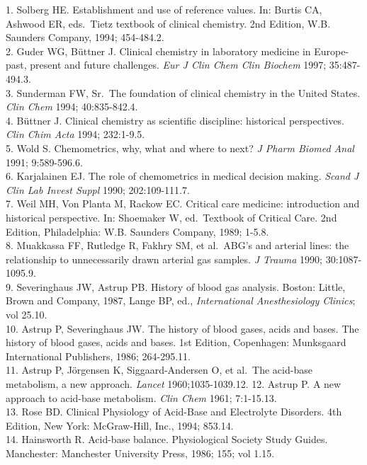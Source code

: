 \documentclass[
  12pt,
  a4paperpaper,
]{report}
\begin{document}
1. Solberg HE. Establishment and use of reference values. In: Burtis CA,
Ashwood ER, eds.~Tietz textbook of clinical chemistry. 2nd Edition, W.B.
Saunders Company, 1994; 454-484.2.\\
2. Guder WG, Büttner J. Clinical chemistry in laboratory medicine in
Europe-past, present and future challenges. \emph{Eur J Clin Chem Clin
Biochem} 1997; 35:487-494.3.\\
3. Sunderman FW, Sr.~The foundation of clinical chemistry in the United
States. \emph{Clin Chem} 1994; 40:835-842.4.\\
4. Büttner J. Clinical chemistry as scientific discipline: historical
perspectives. \emph{Clin Chim Acta} 1994; 232:1-9.5.\\
5. Wold S. Chemometrics, why, what and where to next? \emph{J Pharm
Biomed Anal} 1991; 9:589-596.6.\\
6. Karjalainen EJ. The role of chemometrics in medical decision making.
\emph{Scand J Clin Lab Invest Suppl} 1990; 202:109-111.7.\\
7. Weil MH, Von Planta M, Rackow EC. Critical care medicine:
introduction and historical perspective. In: Shoemaker W, ed.~Textbook
of Critical Care. 2nd Edition, Philadelphia: W.B. Saunders Company,
1989; 1-5.8.\\
8. Muakkassa FF, Rutledge R, Fakhry SM, et al.~ABG's and arterial lines:
the relationship to unnecessarily drawn arterial gas samples. \emph{J
Trauma} 1990; 30:1087-1095.9.\\
9. Severinghaus JW, Astrup PB. History of blood gas analysis. Boston:
Little, Brown and Company, 1987, Lange BP, ed., \emph{International
Anesthesiology Clinics}; vol 25.10.\\
10. Astrup P, Severinghaus JW. The history of blood gases, acids and
bases. The history of blood gases, acids and bases. 1st Edition,
Copenhagen: Munksgaard International Publishers, 1986; 264-295.11.\\
11. Astrup P, Jörgensen K, Siggaard-Andersen O, et al.~The acid-base
metabolism, a new approach. \emph{Lancet} 1960;1035-1039.12. 12. Astrup
P. A new approach to acid-base metabolism. \emph{Clin Chem} 1961;
7:1-15.13.\\
13. Rose BD. Clinical Physiology of Acid-Base and Electrolyte Disorders.
4th Edition, New York: McGraw-Hill, Inc., 1994; 853.14.\\
14. Hainsworth R. Acid-base balance. Physiological Society Study Guides.
Manchester: Manchester University Press, 1986; 155; vol 1.15.\\
\end{document}
